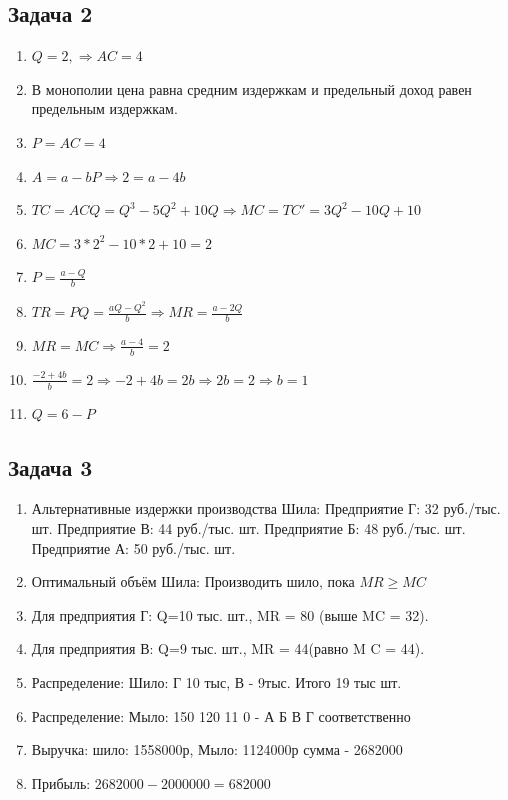 \documentclass[a4paper,12pt]{article}
\begin{document}
\subsection{Задача 2}

\begin{enumerate}
    \item $Q = 2, \Rightarrow AC = 4$
    \item В монополии цена равна средним издержкам и предельный доход равен предельным издержкам.
    \item $P=AC=4$
    \item $A=a-bP \Rightarrow 2 = a-4b$
    \item $TC=ACQ=Q^3-5Q^2+10Q \Rightarrow MC = TC'=3Q^2-10Q+10$
    \item $MC = 3*2^2-10*2+10=2$
    \item $P=\frac{a-Q}{b}$
    \item $TR = PQ = \frac{aQ-Q^2}{b} \Rightarrow MR = \frac{a-2Q}{b}$
    \item $MR = MC \Rightarrow \frac{a-4}{b}=2$
    \item $\frac{-2+4b}{b}=2 \Rightarrow -2+4b=2b \Rightarrow 2b = 2 \Rightarrow b = 1$
    \item $Q=6-P$
\end{enumerate}

\subsection{Задача 3}

\begin{enumerate}
    \item Альтернативные издержки производства Шила: Предприятие Г: 32 руб./тыс. шт. Предприятие В: 44 руб./тыс. шт. Предприятие Б: 48 руб./тыс. шт. Предприятие А: 50 руб./тыс. шт.
    \item Оптимальный объём Шила: Производить шило, пока $MR \ge MC$
    \item Для предприятия Г: Q=10 тыс. шт., MR = 80 (выше MC = 32).
    \item Для предприятия В: Q=9 тыс. шт., MR = 44(равно M C = 44).
    \item Распределение: Шило: Г 10 тыс, В - 9тыс. Итого 19 тыс шт.
    \item Распределение: Мыло: 150 120 11 0 - А Б В Г соответственно
    \item Выручка: шило: 1558000р, Мыло: 1124000р  сумма - 2682000
    \item Прибыль: $2682000 - 2000000 = 682000$
\end{enumerate}
\end{document}
